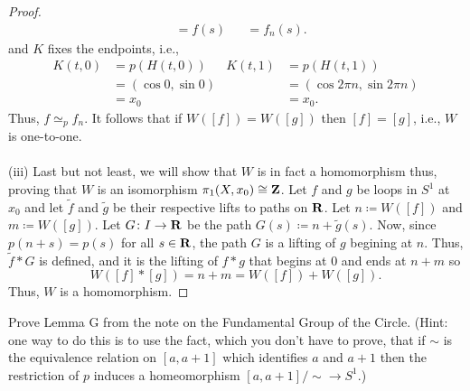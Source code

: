 \begin{proof}
\begin{align*}
&=f(s)&
&=f_n(s).
\end{align*}
and $K$ fixes the endpoints, i.e.,
\begin{align*}
K(t,0)&=p(H(t,0))&
K(t,1)&=p(H(t,1))\\
&=(\cos 0,\sin 0)&
&=(\cos 2\pi n,\sin 2\pi n)\\
&=x_0&
&=x_0.
\end{align*}
Thus, $f\simeq_p f_n$. It follows that if $W([f])=W([g])$ then $[f]=[g]$,
i.e., $W$ is one-to-one.
\\\\
(iii) Last but not least, we will show that $W$ is in fact a homomorphism
thus, proving that $W$ is an isomorphism $\pi_1(X,x_0)\cong\mathbf{Z}$. Let $f$
and $g$ be loops in $S^1$ at $x_0$ and let $\tilde f$ and $\tilde g$ be
their respective lifts to paths on $\mathbf{R}$. Let $n\coloneqq W([f])$ and
$m\coloneqq W([g])$. Let $G\colon I\to\mathbf{R}$ be the path $G(s)\coloneqq
n+\tilde g(s)$. Now, since $p(n+s)=p(s)$ for all $s\in\mathbf{R}$, the path $G$ is
a lifting of $g$ begining at $n$. Thus, $\tilde f*G$ is defined, and
it is the lifting of $f*g$ that begins at $0$ and ends at $n+m$ so
\[
W([f]*[g])=n+m=W([f])+W([g]).
\]
Thus, $W$ is a homomorphism.
\end{proof}
\newpage
\begin{problem}[(B)]
Prove Lemma G from the note on the Fundamental Group of the Circle. (Hint:
one way to do this is to use the fact, which you don’t have to prove, that
if $\sim$ is the equivalence relation on $[a,a+1]$ which identifies $a$ and
$a+1$ then the restriction of $p$ induces a homeomorphism
$[a,a+1]/{\sim}\to S^1$.)
\end{problem}
